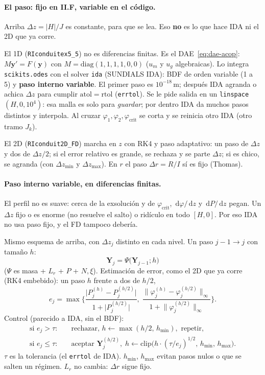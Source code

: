 \documentclass[11pt,a4paper]{article}
\newcommand{\dd}{\,\mathrm{d}}
\begin{document}
\paragraph{El paso: fijo en II.F, variable en el código.}
Arriba $\Delta z=|H|/J$ es constante, para que se lea.
Eso \textbf{no} es lo que hace IDA ni el 2D que ya corre.

El 1D (\texttt{RIconduitex5\_5}) no es diferencias finitas.
Es el DAE~\eqref{eq:dae-acop}:
$M\mathbf{y}'=F(\mathbf{y})$ con
$M=\mathrm{diag}(1,1,1,1,0,0)$
($u_m$ y $u_g$ algebraicas).
Lo integra \texttt{scikits.odes} con el solver
\texttt{ida} (SUNDIALS IDA): BDF de orden variable (1 a 5)
y \textbf{paso interno variable}. El primer paso es
$10^{-18}\,\mathrm{m}$; después IDA agranda o achica
$\Delta z$ para cumplir $\mathrm{atol}=\mathrm{rtol}$
(\texttt{errtol}). Se le pide salida en un
\texttt{linspace}$(H,0,10^4)$: esa malla es solo para
\emph{guardar}; por dentro IDA da muchos pasos distintos
y interpola. Al cruzar $\varphi_1,\varphi_2,\varphi_{\mathrm{crit}}$
se corta y se reinicia otro IDA (otro tramo $J_k$).

El 2D (\texttt{RIconduit2D\_FD}) marcha en $z$ con RK4 y
paso adaptativo: un paso de $\Delta z$ y dos de
$\Delta z/2$; si el error relativo es grande, se rechaza y
se parte $\Delta z$; si es chico, se agranda (con
$\Delta z_{\min}$ y $\Delta z_{\max}$). En $r$ el paso
$\Delta r=R/I$ sí es fijo (Thomas).

\paragraph{Paso interno variable, en diferencias finitas.}
El perfil no es suave: cerca de la exsolución y de
$\varphi_{\mathrm{crit}}$, $\dd\varphi/\dd z$ y $\dd P/\dd z$
pegan. Un $\Delta z$ fijo o es enorme (no resuelve el salto)
o ridículo en todo $[H,0]$. Por eso IDA no usa paso fijo, y
el FD tampoco debería.

Mismo esquema de arriba, con $\Delta z_j$ distinto en cada
nivel. Un paso $j-1\to j$ con tamaño $h$:
\[
\mathbf{Y}_j
=\Psi\bigl(\mathbf{Y}_{j-1};h\bigr)
\]
($\Psi$ es masa + $L_r$ + $P$ + $N,\xi$). Estimación de
error, como el 2D que ya corre (RK4 embebido): un paso $h$
frente a dos de $h/2$,
\begin{equation}
\label{eq:err-h}
e_j
=\max\Biggl\{
\frac{\lvert P^{(h)}_j-P^{(h/2)}_j\rvert}{1+\lvert P^{(h/2)}_j\rvert},\;
\frac{\lVert\varphi^{(h)}_j-\varphi^{(h/2)}_j\rVert_\infty}{1+\lVert\varphi^{(h/2)}_j\rVert_\infty}
\Biggr\}.
\end{equation}
Control (parecido a IDA, sin el BDF):
\begin{equation}
\label{eq:dz-adapt}
\begin{aligned}
\text{si }e_j>\tau:&\quad
\text{rechazar, }h\leftarrow\max(h/2,\,h_{\min}),
\text{ repetir},
\\
\text{si }e_j\le\tau:&\quad
\text{aceptar }\mathbf{Y}^{(h/2)}_j,\;
h\leftarrow\mathrm{clip}\bigl(h\cdot(\tau/e_j)^{1/2},\,h_{\min},\,h_{\max}\bigr).
\end{aligned}
\end{equation}
$\tau$ es la tolerancia (el \texttt{errtol} de IDA).
$h_{\min}$, $h_{\max}$ evitan pasos nulos o que se salten
un régimen. $L_r$ no cambia: $\Delta r$ sigue fijo.
\end{document}
